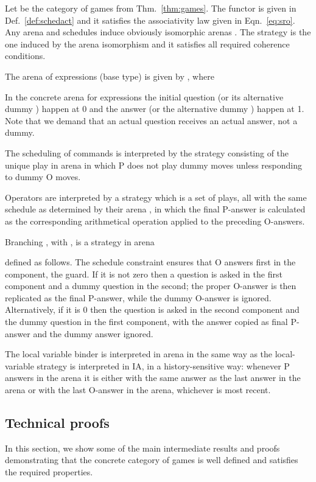 \documentclass{article}
\begin{document}
Let  be the category of games from Thm.~\ref{thm:games}. The functor  is given in Def.~\ref{def:schedact} and it satisfies the associativity law given in Eqn.~\ref{eq:sro}. Any arena  and schedules  induce obviously isomorphic arenas
 . The strategy  is the one induced by the arena isomorphism and it satisfies all required coherence conditions. 

The arena of expressions (base type) is given by , where

In the concrete arena for expressions the initial question  (or its alternative dummy ) happen at 0 and the answer  (or the alternative dummy ) happen at 1. Note that we demand that an actual question receives an actual answer, not a dummy. 

The scheduling of commands  is interpreted by the strategy consisting of the unique play in arena  in which P does not play dummy moves unless responding to dummy O moves.

Operators  are interpreted by a strategy which is a set of plays, all with the same schedule as determined by their arena , in which the final P-answer is calculated as the corresponding arithmetical operation applied to the preceding O-answers. 

Branching , with , is a strategy in arena

defined as follows. The schedule constraint  ensures that O answers first in the  component, the guard. If it is not zero then a question is asked in the first  component and a dummy question in the second; the proper O-answer is then replicated as the final P-answer, while the dummy O-answer is ignored. Alternatively, if it is 0 then the question is asked in the second component and the dummy question in the first component, with the answer copied as final P-answer and the dummy answer ignored. 

The local variable binder  is interpreted in arena  in the same way as the local-variable strategy is interpreted in IA, in a history-sensitive way: whenever P answers in the  arena it is either with the same answer as the last answer in the  arena or with the last O-answer in the  arena, whichever is most recent.  

\subsection{Technical proofs}\label{sec:tec}

In this section, we show some of the main intermediate results and proofs demonstrating that the concrete category of games  is well defined and satisfies the required properties. 
\end{document}
